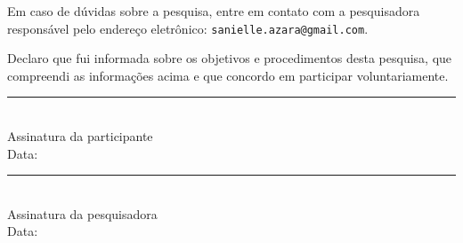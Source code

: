 Em caso de dúvidas sobre a pesquisa, entre em contato com a pesquisadora responsável pelo endereço eletrônico: \texttt{sanielle.azara@gmail.com}.

\bigskip

Declaro que fui informada sobre os objetivos e procedimentos desta pesquisa, que compreendi as informações acima e que concordo em participar voluntariamente.

\bigskip
\bigskip

\noindent
\begin{minipage}{0.45\textwidth}
    \centering
    \rule{6cm}{0.4pt}\\
    Assinatura da participante\\
    \bigskip
    Data: \underline{\hspace{3cm}}
\end{minipage}
\hfill
\begin{minipage}{0.45\textwidth}
    \centering
    \rule{6cm}{0.4pt}\\
    Assinatura da pesquisadora\\
    \bigskip
    Data: \underline{\hspace{3cm}}
\end{minipage}
